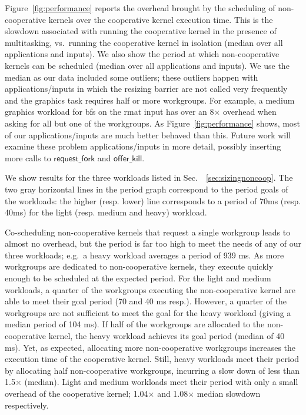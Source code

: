 \documentclass[sigconf]{acmart}
\newcommand{\myfiglong}{Figure~}
\newcommand{\mysec}{Sec.~}
\newcommand{\offerfork}{\mathsf{request\_fork}}
\newcommand{\offerkill}{\mathsf{offer\_kill}}
\begin{document}
{ \myfiglong\ref{fig:performance} reports the
overhead brought by the scheduling of non-cooperative kernels over the
cooperative kernel execution time.  This is the slowdown associated
with running the cooperative kernel in the presence of multitasking,
vs.\ running the cooperative kernel in isolation (median over all
applications and inputs).  We also show the period at which
non-cooperative kernels can be scheduled (median over all applications
and inputs). We use the median as our data included some outliers;
these outliers happen with applications/inputs in which the resizing
barrier are not called very frequently and the graphics task requires
half or more workgroups. For example, a medium graphics workload for
bfs on the rmat input has over an 8$\times$ overhead when asking for
all but one of the workgroups. As \myfiglong\ref{fig:performance}
shows, most of our applications/inputs are much better behaved than
this. Future work will examine these problem applications/inputs in
more detail, possibly inserting more calls to $\offerfork$ and
$\offerkill$.

We show results for the three workloads listed in
\mysec~\ref{sec:sizingnoncoop}. The two gray horizontal lines in the
period graph correspond to the period goals of the workloads: the
higher (resp. lower) line corresponds to a period of 70ms (resp. 40ms)
for the light (resp. medium and heavy) workload.

Co-scheduling non-cooperative kernels that request a single workgroup
leads to almost no overhead, but the period is far too high to meet
the needs of any of our three workloads; e.g.\ a heavy workload
averages a period of 939 ms. As more workgroups are dedicated to
non-cooperative kernels, they execute quickly enough to be scheduled
at the expected period. For the light and medium workloads, a quarter
of the workgroups executing the non-cooperative kernel are able to
meet their goal period (70 and 40 ms resp.). However, a quarter of the
workgroups are not sufficient to meet the goal for the heavy workload
(giving a median period of 104 ms). If half of the workgroups are
allocated to the non-cooperative kernel, the heavy workload achieves
its goal period (median of 40 ms). 
%
Yet, as expected, allocating more non-cooperative workgroups increases
the execution time of the cooperative kernel.
%
Still, heavy workloads meet their period by allocating half
non-cooperative workgroups, incurring a slow down of less than
1.5$\times$ (median). Light and medium workloads meet their period
with only a small overhead of the cooperative kernel; 
1.04$\times$ and 1.08$\times$ median slowdown respectively.

}
\end{document}
